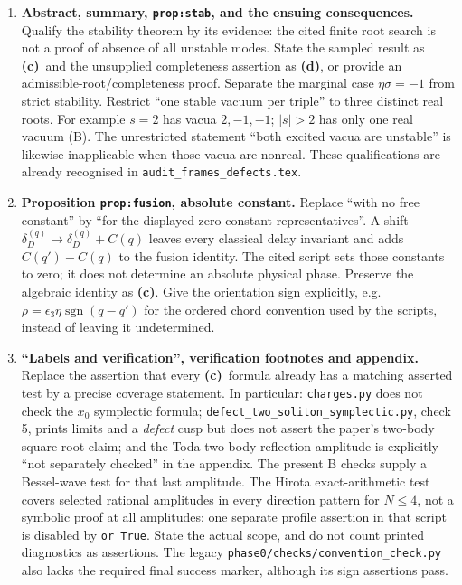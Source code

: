 \documentclass[11pt,a4paper]{article}
\newcommand{\C}{\textsf{\textbf{(c)}}}
\newcommand{\D}{\textsf{\textbf{(d)}}}
\newcommand{\file}[1]{\nolinkurl{#1}}
\begin{document}
\begin{enumerate}[label=R\arabic*.,leftmargin=*,itemsep=8pt]
\item \textbf{Abstract, summary, \file{prop:stab}, and the ensuing consequences.}
Qualify the stability theorem by its evidence: the cited finite root search
is not a proof of absence of all unstable modes. State the sampled result
as \C\ and the unsupplied completeness assertion as \D, or provide an
admissible-root/completeness proof. Separate the marginal case
$\eta\sigma=-1$ from strict stability. Restrict ``one stable vacuum per
triple'' to three distinct real roots. For example $s=2$ has vacua
$2,-1,-1$; $|s|>2$ has only one real vacuum (B).
The unrestricted statement ``both excited vacua are unstable'' is likewise
inapplicable when those vacua are nonreal. These qualifications are already
recognised in \file{audit_frames_defects.tex}.

\item \textbf{Proposition \file{prop:fusion}, absolute constant.}
Replace ``with no free constant'' by ``for the displayed zero-constant
representatives''. A shift $\delta_D^{(q)}\mapsto\delta_D^{(q)}+C(q)$ leaves
every classical delay invariant and adds $C(q')-C(q)$ to the fusion
identity. The cited script sets those constants to zero; it does not
determine an absolute physical phase. Preserve the algebraic identity as
\C. Give the orientation sign explicitly, e.g.
$\rho=\epsilon_3\eta\operatorname{sgn}(q-q')$ for the ordered chord
convention used by the scripts, instead of leaving it undetermined.

\item \textbf{``Labels and verification'', verification footnotes and appendix.}
Replace the assertion that every \C\ formula already has a matching asserted
test by a precise coverage statement. In particular:
\file{charges.py} does not check the $x_0$ symplectic formula;
\file{defect_two_soliton_symplectic.py}, check 5, prints limits and a
\emph{defect} cusp but does not assert the paper's two-body square-root
claim; and the Toda two-body reflection amplitude is explicitly ``not
separately checked'' in the appendix. The present B checks supply a
Bessel-wave test for that last amplitude. The Hirota exact-arithmetic test
covers selected rational amplitudes in every direction pattern for
$N\le4$, not a symbolic proof at all amplitudes; one separate profile
assertion in that script is disabled by \file{or True}. State the actual
scope, and do not count printed diagnostics as assertions. The legacy
\file{phase0/checks/convention_check.py} also lacks the required final
success marker, although its sign assertions pass.


\end{enumerate}
\end{document}
